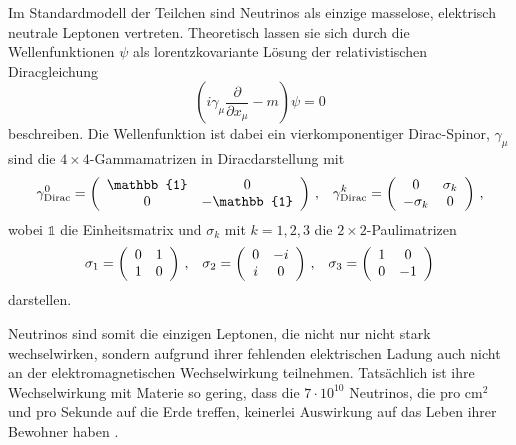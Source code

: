 Im Standardmodell der Teilchen sind Neutrinos als einzige masselose, elektrisch neutrale Leptonen vertreten.
Theoretisch lassen sie sich durch die Wellenfunktionen $\psi$ als lorentzkovariante Lösung der relativistischen Diracgleichung
\begin{equation}
    \left(i \gamma_\mu \frac{\partial}{\partial x_\mu} - m \right) \psi = 0
    \label{eq:dirac}
\end{equation}
beschreiben.
Die Wellenfunktion ist dabei ein vierkomponentiger Dirac-Spinor, $\gamma_\mu$ sind die $4 \times 4$-Gammamatrizen in Diracdarstellung mit
\begin{align}
    \gamma^0_\text{Dirac} = \left( \begin{array}{c c}
        \mathbb{1} & 0          \\ 
        0          & -\mathbb{1} \\ 
        \end{array}\right) \,,
    &&
    \gamma^k_\text{Dirac} = \left( \begin{array}{c c}
        0           & \sigma_k  \\ 
        -\sigma_k   & 0         \\ 
        \end{array}\right) \,,
    \label{eq:gammamatrizen}
\end{align}
wobei $\mathbb{1}$ die Einheitsmatrix und $\sigma_k$ mit $k = 1, 2, 3$ die $2 \times 2$-Paulimatrizen
\begin{align}
    \sigma_1 = \left( \begin{array}{c c}
        0 & 1   \\ 
        1 & 0   \\ 
        \end{array}\right) \,,
    &&
    \sigma_2 = \left( \begin{array}{c c}
        0           & -i  \\ 
        i  & 0         \\ 
        \end{array}\right) \,,
    &&
    \sigma_3 = \left( \begin{array}{c c}
        1           & 0 \\ 
        0   & -1         \\ 
        \end{array}\right)
    \label{eq:paulimatrizen}
\end{align}
darstellen. 

Neutrinos sind somit die einzigen Leptonen, die nicht nur nicht stark wechselwirken, sondern aufgrund ihrer fehlenden elektrischen Ladung auch nicht an der elektromagnetischen Wechselwirkung teilnehmen.
Tatsächlich ist ihre Wechselwirkung mit Materie so gering, dass die $7 \cdot 10^{10}$  Neutrinos, die pro $\si{\centi\meter}^2$ und pro Sekunde auf die Erde treffen, keinerlei Auswirkung
auf das Leben ihrer Bewohner haben \cite[S. ~133]{grupen}. 

